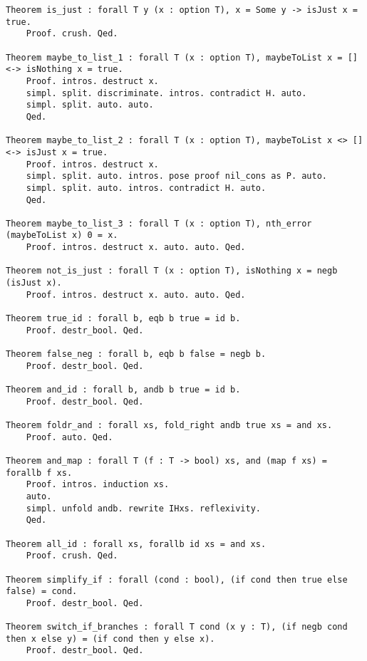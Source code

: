 \begin{verbatim}
Theorem is_just : forall T y (x : option T), x = Some y -> isJust x = true.
    Proof. crush. Qed.

Theorem maybe_to_list_1 : forall T (x : option T), maybeToList x = [] <-> isNothing x = true.
    Proof. intros. destruct x.
    simpl. split. discriminate. intros. contradict H. auto.
    simpl. split. auto. auto.
    Qed.

Theorem maybe_to_list_2 : forall T (x : option T), maybeToList x <> [] <-> isJust x = true.
    Proof. intros. destruct x.
    simpl. split. auto. intros. pose proof nil_cons as P. auto.
    simpl. split. auto. intros. contradict H. auto.
    Qed.

Theorem maybe_to_list_3 : forall T (x : option T), nth_error (maybeToList x) 0 = x.
    Proof. intros. destruct x. auto. auto. Qed.

Theorem not_is_just : forall T (x : option T), isNothing x = negb (isJust x).
    Proof. intros. destruct x. auto. auto. Qed.

Theorem true_id : forall b, eqb b true = id b.
    Proof. destr_bool. Qed.

Theorem false_neg : forall b, eqb b false = negb b.
    Proof. destr_bool. Qed.

Theorem and_id : forall b, andb b true = id b.
    Proof. destr_bool. Qed.

Theorem foldr_and : forall xs, fold_right andb true xs = and xs.
    Proof. auto. Qed.

Theorem and_map : forall T (f : T -> bool) xs, and (map f xs) = forallb f xs.
    Proof. intros. induction xs.
    auto.
    simpl. unfold andb. rewrite IHxs. reflexivity.
    Qed.

Theorem all_id : forall xs, forallb id xs = and xs.
    Proof. crush. Qed.

Theorem simplify_if : forall (cond : bool), (if cond then true else false) = cond.
    Proof. destr_bool. Qed.

Theorem switch_if_branches : forall T cond (x y : T), (if negb cond then x else y) = (if cond then y else x).
    Proof. destr_bool. Qed.
\end{verbatim}
